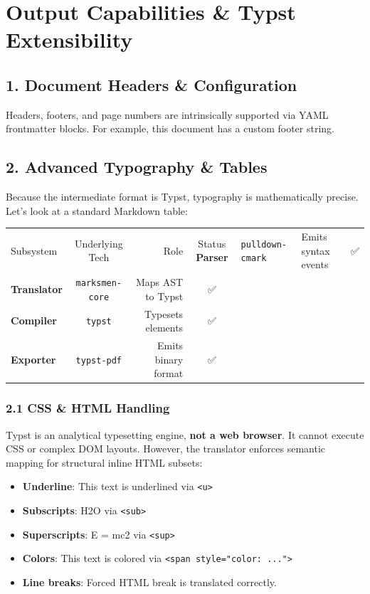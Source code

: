 \documentclass{article}
\begin{document}
\section{Output Capabilities \& Typst Extensibility}

\subsection{1. Document Headers \& Configuration}


Headers, footers, and page numbers are intrinsically supported via YAML frontmatter blocks. For example, this document has a custom footer string.

\subsection{2. Advanced Typography \& Tables}


Because the intermediate format is Typst, typography is mathematically precise. Let's look at a standard Markdown table:

\begin{longtable}{lcrc}
\toprule
Subsystem & Underlying Tech & Role & Status\midrule
\textbf{Parser} & \texttt{pulldown-cmark} & Emits syntax events & ✅ \\
\textbf{Translator} & \texttt{marksmen-core} & Maps AST to Typst & ✅ \\
\textbf{Compiler} & \texttt{typst} & Typesets elements & ✅ \\
\textbf{Exporter} & \texttt{typst-pdf} & Emits binary format & ✅ \\
\bottomrule
\end{longtable}

\subsubsection{2.1 CSS \& HTML Handling}


Typst is an analytical typesetting engine, \textbf{not a web browser}. It cannot execute CSS or complex DOM layouts. However, the translator enforces semantic mapping for structural inline HTML subsets:

\begin{itemize}
\item \textbf{Underline}: This text is underlined via \texttt{\textless{}u\textgreater{}}
\item \textbf{Subscripts}: H2O via \texttt{\textless{}sub\textgreater{}}
\item \textbf{Superscripts}: E = mc2 via \texttt{\textless{}sup\textgreater{}}
\item \textbf{Colors}: This text is colored via \texttt{\textless{}span style="color: ..."\textgreater{}}
\item \textbf{Line breaks}: Forced HTML break  is translated correctly.
\end{itemize}
\end{document}
